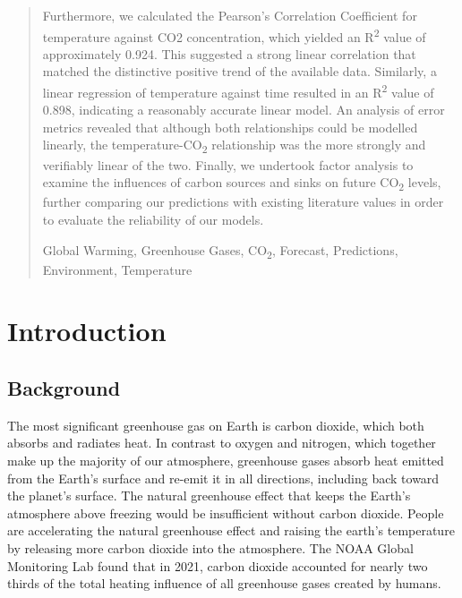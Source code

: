 \documentclass[12pt]{mcmthesis}
\begin{document}
\begin{abstract}
        Furthermore, we calculated the Pearson’s Correlation Coefficient for temperature against CO2 concentration, which yielded an R\textsuperscript{2} value of approximately 0.924. This suggested a strong linear correlation that matched the distinctive positive trend of the available data. Similarly, a linear regression of temperature against time resulted in an R\textsuperscript{2} value of 0.898, indicating a reasonably accurate linear model. An analysis of error metrics revealed that although both relationships could be modelled linearly, the temperature-CO\textsubscript{2} relationship was the more strongly and verifiably linear of the two. Finally, we undertook factor analysis to examine the influences of carbon sources and sinks on future CO\textsubscript{2} levels, further comparing our predictions with existing literature values in order to evaluate the reliability of our models.



        \begin{keywords}
            Global Warming, Greenhouse Gases, CO\textsubscript{2}, Forecast, Predictions, Environment, Temperature
        \end{keywords}

    \end{abstract}

    \maketitle

    \setcounter{page}{2}

    \setlength{\cftparskip}{0pt}
    \tableofcontents

    \newpage


    


    \section{Introduction}

    \subsection{Background}
    The most significant greenhouse gas on Earth is carbon dioxide, which both absorbs and radiates heat. In contrast to oxygen and nitrogen, which together make up the majority of our atmosphere, greenhouse gases absorb heat emitted from the Earth's surface and re-emit it in all directions, including back toward the planet's surface. The natural greenhouse effect that keeps the Earth's atmosphere above freezing would be insufficient without carbon dioxide. People are accelerating the natural greenhouse effect and raising the earth's temperature by releasing more carbon dioxide into the atmosphere. The NOAA Global Monitoring Lab found that in 2021, carbon dioxide accounted for nearly two thirds of the total heating influence of all greenhouse gases created by humans.
\end{document}
